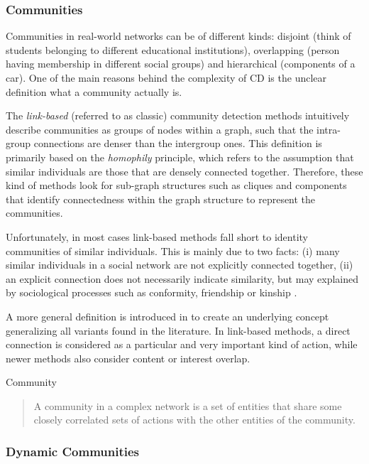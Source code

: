 \documentclass[
acmsmall,
nonacm,
screen,
acmthm]{../../scripts/pandoc/templates/acmart}
\begin{document}
\hypertarget{communities}{%
\subsubsection{Communities}\label{communities}}

Communities in real-world networks can be of different kinds: disjoint
(think of students belonging to different educational institutions),
overlapping (person having membership in different social groups) and
hierarchical (components of a car). One of the main reasons behind the
complexity of CD is the unclear definition what a community actually is.

The \emph{link-based} (referred to as classic) community detection
methods intuitively describe communities as groups of nodes within a
graph, such that the intra-group connections are denser than the
intergroup ones. This definition is primarily based on the
\emph{homophily} principle, which refers to the assumption that similar
individuals are those that are densely connected together. Therefore,
these kind of methods look for sub-graph structures such as cliques and
components that identify connectedness within the graph structure to
represent the communities.

Unfortunately, in most cases link-based methods fall short to identity
communities of similar individuals. This is mainly due to two facts: (i)
many similar individuals in a social network are not explicitly
connected together, (ii) an explicit connection does not necessarily
indicate similarity, but may explained by sociological processes such as
conformity, friendship or kinship
\citep{diehlRelationshipIdentificationSocial2007, faniUserCommunityDetection2020}.

A more general definition is introduced in
\citep{cosciaClassificationCommunityDiscovery2011} to create an
underlying concept generalizing all variants found in the literature. In
link-based methods, a direct connection is considered as a particular
and very important kind of action, while newer methods also consider
content or interest overlap.

\protect\hypertarget{thm:id}{}{Community}

\begin{quote}
A community in a complex network is a set of entities that share some
closely correlated sets of actions with the other entities of the
community.
\end{quote}

\hypertarget{dynamic-communities}{%
\subsubsection{Dynamic Communities}\label{dynamic-communities}}
\end{document}
